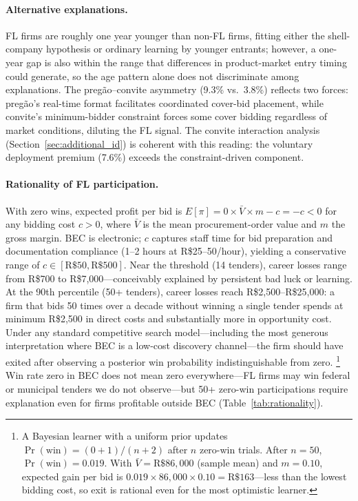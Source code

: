 \paragraph{Alternative explanations.}
FL firms are roughly one year younger than non-FL firms, fitting
either the shell-company hypothesis or ordinary learning by younger
entrants; however, a one-year gap is also within the range that
differences in product-market entry timing could generate, so the
age pattern alone does not discriminate among explanations. The preg\~ao--convite asymmetry (9.3\% vs.\ 3.8\%) reflects
two forces: preg\~ao's real-time format facilitates coordinated
cover-bid placement, while convite's minimum-bidder constraint forces
some cover bidding regardless of market conditions, diluting the FL
signal. The convite interaction analysis
(Section~\ref{sec:additional_id}) is coherent with this reading: the voluntary
deployment premium (7.6\%) exceeds the constraint-driven component.

\paragraph{Rationality of FL participation.}
\label{sec:rationality}
With zero wins, expected profit per bid is
$E[\pi] = 0 \times \bar{V} \times m - c = -c < 0$
for any bidding cost $c > 0$, where $\bar{V}$ is the mean
procurement-order value and $m$ the gross margin. BEC is electronic;
$c$ captures staff time for bid preparation and documentation
compliance (1--2 hours at R\$25--50/hour), yielding a conservative
range of $c \in [\text{R\$50}, \text{R\$500}]$. Near the threshold
(14 tenders), career losses range from R\$700 to R\$7,000---conceivably
explained by persistent bad luck or learning. At the 90th percentile
(50+ tenders), career losses reach R\$2,500--R\$25,000: a firm that
bids 50 times over a decade without winning a single tender spends at
minimum R\$2,500 in direct costs and substantially more in opportunity
cost. Under any standard competitive search model---including the most
generous interpretation where BEC is a low-cost discovery channel---the
firm should have exited after observing a posterior win probability
indistinguishable from zero.%
\footnote{A Bayesian learner with a uniform prior updates
$\Pr(\text{win}) = (0 + 1) / (n + 2)$ after $n$ zero-win trials.
After $n = 50$, $\Pr(\text{win}) = 0.019$. With $\bar{V} = \text{R\$}86{,}000$
(sample mean) and $m = 0.10$, expected gain per bid is
$0.019 \times 86{,}000 \times 0.10 = \text{R\$}163$---less than the
lowest bidding cost, so exit is rational even for the most optimistic
learner.}
Win rate zero in BEC does not mean zero everywhere---FL firms may
win federal or municipal tenders we do not observe---but 50+ zero-win
participations require explanation even for firms profitable outside
BEC \citep{asker2010leniency, marshall2012economics}
(Table~\ref{tab:rationality}).

